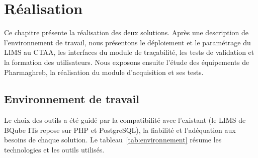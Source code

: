 \chapter{Réalisation}
\label{chap:realisation}

Ce chapitre présente la réalisation des deux solutions. Après une description de l'environnement de travail, nous présentons le déploiement et le paramétrage du \ac{LIMS} au \ac{CTAA}, les interfaces du module de traçabilité, les tests de validation et la formation des utilisateurs. Nous exposons ensuite l'étude des équipements de Pharmaghreb, la réalisation du module d'acquisition et ses tests.

\section{Environnement de travail}

Le choix des outils a été guidé par la compatibilité avec l'existant (le \ac{LIMS} de BQube ITs repose sur \ac{PHP} et PostgreSQL), la fiabilité et l'adéquation aux besoins de chaque solution. Le tableau~\ref{tab:environnement} résume les technologies et les outils utilisés.

